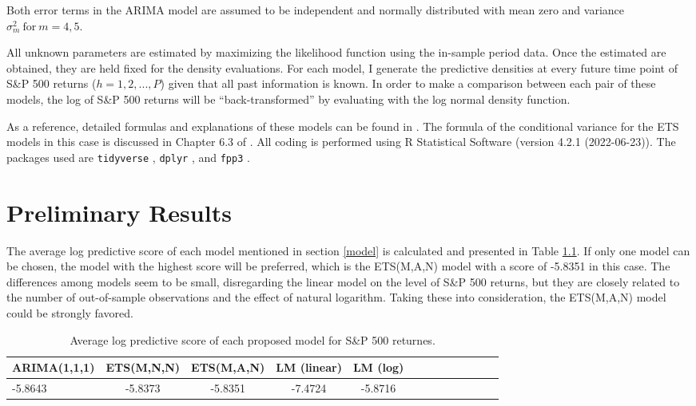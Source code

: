 \documentclass{monashthesis}
\begin{document}
Both error terms in the ARIMA model are assumed to be independent and normally distributed with mean zero and variance \(\sigma_m^2 \ \text{for}\  m = 4,5\).

All unknown parameters are estimated by maximizing the likelihood function using the in-sample period data. Once the estimated are obtained, they are held fixed for the density evaluations. For each model, I generate the predictive densities at every future time point of S\&P 500 returns (\(h=1,2,...,P\)) given that all past information is known. In order to make a comparison between each pair of these models, the log of S\&P 500 returns will be ``back-transformed'' by evaluating with the log normal density function.

As a reference, detailed formulas and explanations of these models can be found in \textcite{fpp3}. The formula of the conditional variance for the ETS models in this case is discussed in Chapter 6.3 of \textcite{HKOS08}. All coding is performed using R Statistical Software (version 4.2.1 (2022-06-23)). The packages used are \texttt{tidyverse} \autocite{tidy19}, \texttt{dplyr} \autocite{dplyr23}, and \texttt{fpp3} \autocite{fpp23}.

\hypertarget{preliminary-results}{%
\chapter{Preliminary Results}\label{preliminary-results}}

The average log predictive score of each model mentioned in section \ref{model} is calculated and presented in Table \ref{tab:1}. If only one model can be chosen, the model with the highest score will be preferred, which is the ETS(M,A,N) model with a score of -5.8351 in this case. The differences among models seem to be small, disregarding the linear model on the level of S\&P 500 returns, but they are closely related to the number of out-of-sample observations and the effect of natural logarithm. Taking these into consideration, the ETS(M,A,N) model could be strongly favored.

\vspace{0.3cm}

\begin{table}[htbp!]
\centering
\caption{Average log predictive score of each proposed model for S\&P 500 returnes.}
\begin{tabular}{l*{4}{c}cccccccc}
\hline
     ARIMA(1,1,1) & ETS(M,N,N) & ETS(M,A,N) & LM (linear) & LM (log) \\
    \hline
     -5.8643 & -5.8373  & -5.8351 & -7.4724 & -5.8716\\
    \hline
\end{tabular}
\label{tab:1}
\end{table}
\end{document}
